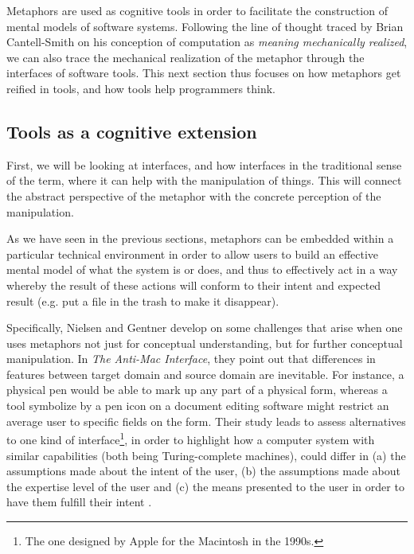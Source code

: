 Metaphors are used as cognitive tools in order to facilitate the construction of mental models of software systems. Following the line of thought traced by Brian Cantell-Smith on his conception of computation as \emph{meaning mechanically realized}, we can also trace the mechanical realization of the metaphor through the interfaces of software tools. This next section thus focuses on how metaphors get reified in tools, and how tools help programmers think.

\subsection{Tools as a cognitive extension}
\label{subsec:tools-cognition}

First, we will be looking at interfaces, and how interfaces in the traditional sense of the term, where it can help with the manipulation of things. This will connect the abstract perspective of the metaphor with the concrete perception of the manipulation.

As we have seen in the previous sections, metaphors can be embedded within a  particular technical environment in order to allow users to build an effective mental model of what the system is or does, and thus to effectively act in  a way whereby the result of these actions will conform to their intent and expected result (e.g. put a file in the trash to make it disappear).

Specifically, Nielsen and Gentner develop on some challenges that arise when one uses metaphors not just for conceptual understanding, but for further conceptual manipulation. In \emph{The Anti-Mac Interface}, they point out that differences in features between target domain and source domain are inevitable. For instance, a physical pen would be able to mark up any part of a physical form, whereas a tool symbolize by a pen icon on a document editing software might restrict an average user to specific fields on the form. Their study leads to assess alternatives to one kind of interface\footnote{The one designed by Apple for the Macintosh in the 1990s.}, in order to highlight how a computer system with similar capabilities (both being Turing-complete machines), could differ in (a) the assumptions made about the intent of the user, (b) the assumptions made about the expertise level of the user and (c) the means presented to the user in order to have them fulfill their intent \citep{gentner_antimac_1996}.

